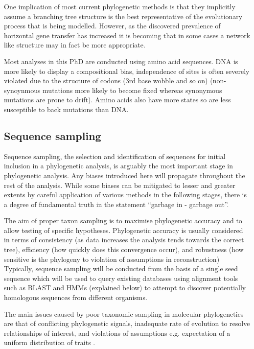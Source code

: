 One implication of most current phylogenetic methods is that they implicitly
assume a branching tree structure is the best representative of the evolutionary
process that is being modelled.  However, as the discovered prevalence of
horizontal gene transfer has increased it is becoming that in some cases
a network like structure may in fact be more appropriate.


Most analyses in this PhD are conducted using amino acid sequences.  
DNA is more likely to display a compositional bias, independence of sites
is often severely violated due to the structure of codons (3rd base wobble and so on)
(non-synoynmous mutations more likely to become fixed whereas synonymous mutations are
prone to drift).  Amino acids also have more states so are less susceptible to back mutations
than DNA.  


\subsection{Sequence sampling}
Sequence sampling, the selection and identification of sequences for initial inclusion in a 
phylogenetic analysis, is arguably the most important stage in phylogenetic analysis.
Any biases introduced here will propagate throughout the rest of the analysis. 
While some biases can be mitigated to lesser and greater extents 
by careful application of various methods in the following
stages, there is a degree of fundamental truth in the statement ``garbage in - garbage out''.

The aim of proper taxon sampling is to maximise phylogenetic accuracy and to allow
testing of specific hypotheses. 
Phylogenetic accuracy is usually considered in terms of consistency (as data increases 
    the analysis tends towards the correct tree), efficiency (how quickly does this convergence
occur), and robustness (how sensitive is the phylogeny to violation of assumptions in reconstruction) \citep{Nabhan2012}
Typically, sequence sampling will be conducted from the basis of a single
seed sequence which will be used to query existing databases using alignment 
tools such as BLAST and HMMs (explained below) to attempt to discover
potentially homologous sequences from different organisms.  


The main issues caused by poor taxonomic sampling in molecular phylogenetics are that
of conflicting phylogenetic signals, inadequate rate of evolution to resolve relationships
of interest, and violations of assumptions e.g. expectation of a uniform distribution of traits \citep{Nabhan2012}.



